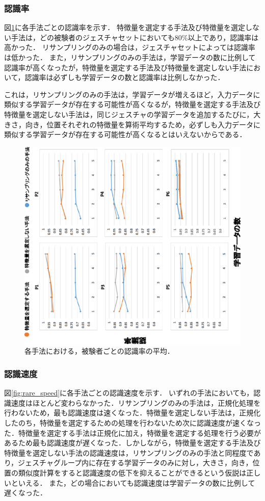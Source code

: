 \subsubsection{認識率}
図\ref{fig:rare_rec}に各手法ごとの認識率を示す．
特徴量を選定する手法及び特徴量を選定しない手法は，どの被験者のジェスチャセットにおいても80\%以上であり，認識率は高かった．
リサンプリングのみの場合は，ジェスチャセットによっては認識率は低かった．
また，リサンプリングのみの手法は，学習データの数に比例して認識率が高くなったが，特徴量を選定する手法及び特徴量を選定しない手法において，認識率は必ずしも学習データの数と認識率は比例しなかった．

これは，リサンプリングのみの手法は，学習データが増えるほど，入力データに類似する学習データが存在する可能性が高くなるが，特徴量を選定する手法及び特徴量を選定しない手法は，同じジェスチャの学習データを追加するたびに，大きさ，向き，位置それぞれの特徴量を算術平均するため，必ずしも入力データに類似する学習データが存在する可能性が高くなるとはいえないからである．

\begin{figure}[!h]
\centering
\includegraphics[width=0.85\columnwidth,angle=-90]{img/pre_rec.eps}
\caption{各手法における，被験者ごとの認識率の平均．}
\label{fig:rare_rec}
\end{figure}

\subsubsection{認識速度}
図\ref{fig:rare_speed}に各手法ごとの認識速度を示す．
いずれの手法においても，認識速度はほとんど変わらなかった．リサンプリングのみの手法は，正規化処理を行わないため，最も認識速度は速くなった．特徴量を選定しない手法は，正規化したのち，特徴量を選定するための処理を行わないため次に認識速度が速くなった．特徴量を選定する手法は正規化に加え，特徴量を選定する処理を行う必要があるため最も認識速度が遅くなった．しかしながら，特徴量を選定する手法及び特徴量を選定しない手法の認識速度は，リサンプリングのみの手法と同程度であり，ジェスチャグループ内に存在する学習データのみに対し，大きさ，向き，位置の類似度計算をすると認識速度の低下を抑えることができるという仮説は正しいといえる．
また，どの場合においても認識速度は学習データの数に比例して遅くなった．

